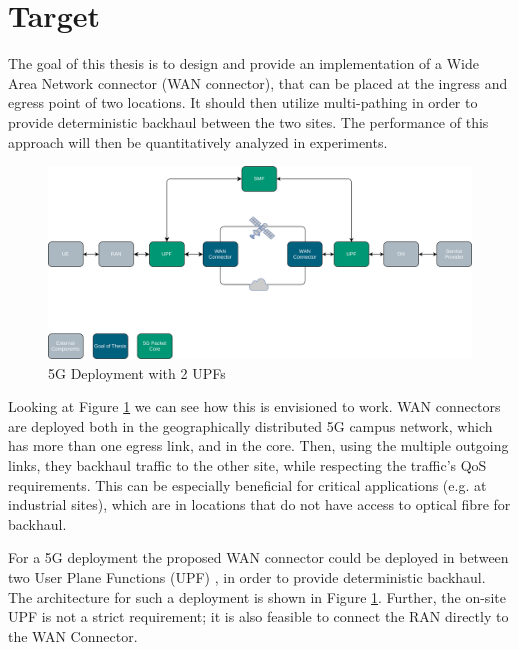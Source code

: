 
\section{Target}
\label{sec:target}

The goal of this thesis is to design and provide an implementation of a Wide Area Network connector (WAN connector), that can be placed at the ingress and egress point of two locations. It should then utilize multi-pathing in order to provide deterministic backhaul between the two sites. The performance of this approach will then be quantitatively analyzed in experiments.

\begin{figure}[h]
    \centering
        \includegraphics[width=\textwidth]{fig/telco-use-case-2.png}
        \caption{5G Deployment with 2 UPFs}
        \label{fig:telco}
\end{figure}

Looking at Figure \ref{fig:telco} we can see how this is envisioned to work. WAN connectors are deployed both in the geographically distributed 5G campus network, which has more than one egress link, and in the core. Then, using the multiple outgoing links, they backhaul traffic to the other site, while respecting the traffic's QoS requirements. This can be especially beneficial for critical applications (e.g. at industrial sites), which are in locations that do not have access to optical fibre for backhaul.

For a 5G deployment the proposed WAN connector could be deployed in between two User Plane Functions (UPF) , in order to provide deterministic backhaul. The architecture for such a deployment is shown in Figure \ref{fig:telco}. Further, the on-site UPF is not a strict requirement; it is also feasible to connect the RAN directly to the WAN Connector.


